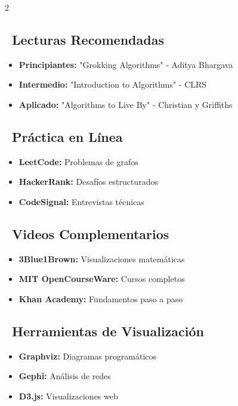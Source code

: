 \documentclass[12pt,a4paper]{article}
\begin{document}
	\begin{multicols}{2}
		\subsection*{\faBook\ Lecturas Recomendadas}
		\begin{itemize}
			\item \textbf{Principiantes:} "Grokking Algorithms" - Aditya Bhargava
			\item \textbf{Intermedio:} "Introduction to Algorithms" - CLRS
			\item \textbf{Aplicado:} "Algorithms to Live By" - Christian y Griffiths
		\end{itemize}
		
		\subsection*{\faCode\ Práctica en Línea}
		\begin{itemize}
			\item \textbf{LeetCode:} Problemas de grafos
			\item \textbf{HackerRank:} Desafíos estructurados
			\item \textbf{CodeSignal:} Entrevistas técnicas
		\end{itemize}
		
		\columnbreak
		
		\subsection*{\faVideo\ Videos Complementarios}
		\begin{itemize}
			\item \textbf{3Blue1Brown:} Visualizaciones matemáticas
			\item \textbf{MIT OpenCourseWare:} Cursos completos
			\item \textbf{Khan Academy:} Fundamentos paso a paso
		\end{itemize}
		
		\subsection*{\faTools\ Herramientas de Visualización}
		\begin{itemize}
			\item \textbf{Graphviz:} Diagramas programáticos
			\item \textbf{Gephi:} Análisis de redes
			\item \textbf{D3.js:} Visualizaciones web
		\end{itemize}
	\end{multicols}
	
\end{document}
